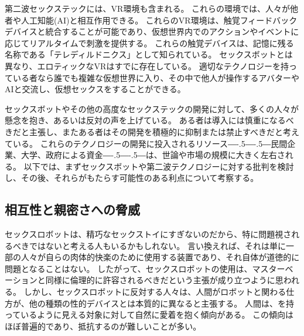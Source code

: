 \documentclass[paper=a4,book,openany]{jlreq}
\def\DDASH{―\kern-.5\zw―\kern-.5\zw―} %
\begin{document}
第二波セックステックには、VR環境も含まれる。
これらの環境では、人々が他者や人工知能(AI)と相互作用できる。
これらのVR環境は、触覚フィードバックデバイスと統合することが可能であり、仮想世界内でのアクションやイベントに応じてリアルタイムで刺激を提供する。
これらの触覚デバイスは、記憶に残る名称である「テレディルドニクス」として知られている。
セックスボットとは異なり、エロティックなVRはすでに存在している。
適切なテクノロジーを持っている者なら誰でも複雑な仮想世界に入り、その中で他人が操作するアバターやAIと交流し、仮想セックスをすることができる。

セックスボットやその他の高度なセックステックの開発に対して、多くの人々が懸念を抱き、あるいは反対の声を上げている。
ある者は導入には慎重になるべきだと主張し、またある者はその開発を積極的に抑制または禁止すべきだと考えている。
これらのテクノロジーの開発に投入されるリソース{\DDASH}民間企業、大学、政府による資金{\DDASH}は、世論や市場の規模に大きく左右される。
以下では、まずセックスボットや第二波テクノロジーに対する批判を検討し、その後、それらがもたらす可能性のある利点について考察する。

\subsection{相互性と親密さへの脅威}

セックスロボットは、精巧なセックストイにすぎないのだから、特に問題視されるべきではないと考える人もいるかもしれない。
言い換えれば、それは単に一部の人々が自らの肉体的快楽のために使用する装置であり、それ自体が道徳的に問題となることはない。
したがって、セックスロボットの使用は、マスターベーションと同様に倫理的に許容されるべきだという主張が成り立つように思われる。
しかし、セックスロボットに反対する人々は、人間がロボットと関わる仕方が、他の種類の性的デバイスとは本質的に異なると主張する。
人間は、を持っているように見える対象に対して自然に愛着を抱く傾向がある。
この傾向はほぼ普遍的であり、抵抗するのが難しいことが多い。
\end{document}
